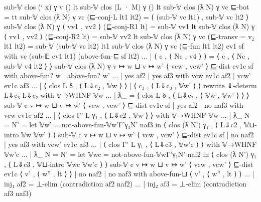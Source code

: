 \begin{fence}
\begin{code}
sub-𝕍 {clos (` x) γ} {v} () lt
sub-𝕍 {clos (L · M) γ} () lt
sub-𝕍 {clos (ƛ N) γ} vc ⊑-bot = tt
sub-𝕍 {clos (ƛ N) γ} vc (⊑-conj-L lt1 lt2) = ⟨ (sub-𝕍 vc lt1) , sub-𝕍 vc lt2 ⟩
sub-𝕍 {clos (ƛ N) γ} ⟨ vv1 , vv2 ⟩ (⊑-conj-R1 lt) = sub-𝕍 vv1 lt
sub-𝕍 {clos (ƛ N) γ} ⟨ vv1 , vv2 ⟩ (⊑-conj-R2 lt) = sub-𝕍 vv2 lt
sub-𝕍 {clos (ƛ N) γ} vc (⊑-trans{v = v₂} lt1 lt2) = sub-𝕍 (sub-𝕍 vc lt2) lt1
sub-𝕍 {clos (ƛ N) γ} vc (⊑-fun lt1 lt2) ev1 sf
    with vc (sub-𝔼 ev1 lt1) (above-fun-⊑ sf lt2)
... | ⟨ c , ⟨ Nc , v4 ⟩ ⟩ = ⟨ c , ⟨ Nc , sub-𝕍 v4 lt2 ⟩ ⟩
sub-𝕍 {clos (ƛ N) γ} {v ↦ w ⊔ v ↦ w'} ⟨ vcw , vcw' ⟩ ⊑-dist ev1c sf
    with above-fun? w | above-fun? w'
... | yes af2 | yes af3
    with vcw ev1c af2 | vcw' ev1c af3
... | ⟨ clos L δ , ⟨ L⇓c₂ , 𝕍w ⟩ ⟩
    | ⟨ c₃ , ⟨ L⇓c₃ , 𝕍w' ⟩ ⟩ rewrite ⇓-determ L⇓c₃ L⇓c₂ with 𝕍→WHNF 𝕍w
... | ƛ_ =
      ⟨ clos L δ , ⟨ L⇓c₂ , ⟨ 𝕍w , 𝕍w' ⟩ ⟩ ⟩
sub-𝕍 {c} {v ↦ w ⊔ v ↦ w'} ⟨ vcw , vcw' ⟩  ⊑-dist ev1c sf
    | yes af2 | no naf3
    with vcw ev1c af2
... | ⟨ clos {Γ'} L γ₁ , ⟨ L⇓c2 , 𝕍w ⟩ ⟩
    with 𝕍→WHNF 𝕍w
... | ƛ_ {N = N'} =
      let 𝕍w' = not-above-fun-𝕍{w'}{Γ'}{γ₁}{N'} naf3 in
      ⟨ clos (ƛ N') γ₁ , ⟨ L⇓c2 , 𝕍⊔-intro 𝕍w 𝕍w' ⟩ ⟩
sub-𝕍 {c} {v ↦ w ⊔ v ↦ w'} ⟨ vcw , vcw' ⟩ ⊑-dist ev1c sf
    | no naf2 | yes af3
    with vcw' ev1c af3
... | ⟨ clos {Γ'} L γ₁ , ⟨ L⇓c3 , 𝕍w'c ⟩ ⟩
    with 𝕍→WHNF 𝕍w'c
... | ƛ_ {N = N'} =
      let 𝕍wc = not-above-fun-𝕍{w}{Γ'}{γ₁}{N'} naf2 in
      ⟨ clos (ƛ N') γ₁ , ⟨ L⇓c3 , 𝕍⊔-intro 𝕍wc 𝕍w'c ⟩ ⟩
sub-𝕍 {c} {v ↦ w ⊔ v ↦ w'} ⟨ vcw , vcw' ⟩ ⊑-dist ev1c ⟨ v' , ⟨ w'' , lt ⟩ ⟩
    | no naf2 | no naf3
    with above-fun-⊔ ⟨ v' , ⟨ w'' , lt ⟩ ⟩
... | inj₁ af2 = ⊥-elim (contradiction af2 naf2)
... | inj₂ af3 = ⊥-elim (contradiction af3 naf3)
\end{code}
\end{fence}

